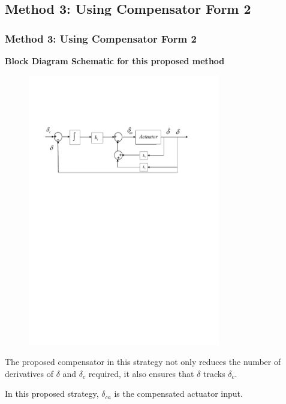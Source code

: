 \documentclass[table,10pt,red]{beamer}	%
\begin{document}
\subsection{Method 3: Using Compensator Form 2}
\begin{frame}
\frametitle{Method 3: Using Compensator Form 2}

\textbf{Block Diagram Schematic for this proposed method}
\begin{figure}[h]
\begin{center}
\includegraphics[width=8.4cm]{fig9}   %
\end{center}
\end{figure}
The proposed compensator in this strategy not only reduces the number of derivatives of $\delta$ and $\delta_c$ required, it also ensures that $\delta$ tracks $\delta_c$.

In this proposed strategy, $\delta_{ca}$ is the compensated actuator input.
\end{frame}
\end{document}
